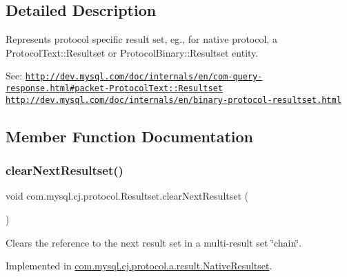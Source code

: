 \subsection{Detailed Description}
Represents protocol specific result set, eg., for native protocol, a Protocol\+Text\+::\+Resultset or Protocol\+Binary\+::\+Resultset entity.

See\+: \href{http://dev.mysql.com/doc/internals/en/com-query-response.html#packet-ProtocolText::Resultset}{\tt http\+://dev.\+mysql.\+com/doc/internals/en/com-\/query-\/response.\+html\#packet-\/\+Protocol\+Text\+::\+Resultset} \href{http://dev.mysql.com/doc/internals/en/binary-protocol-resultset.html}{\tt http\+://dev.\+mysql.\+com/doc/internals/en/binary-\/protocol-\/resultset.\+html} 

\subsection{Member Function Documentation}
\mbox{\label{interfacecom_1_1mysql_1_1cj_1_1protocol_1_1_resultset_ab66d8aa07fe7c7860c0852a7a10f4e27}} 
\subsubsection{\texorpdfstring{clear\+Next\+Resultset()}{clearNextResultset()}}
{\footnotesize\ttfamily void com.\+mysql.\+cj.\+protocol.\+Resultset.\+clear\+Next\+Resultset (\begin{DoxyParamCaption}{ }\end{DoxyParamCaption})}

Clears the reference to the next result set in a multi-\/result set \char`\"{}chain\char`\"{}. 

Implemented in \mbox{\hyperlink{classcom_1_1mysql_1_1cj_1_1protocol_1_1a_1_1result_1_1_native_resultset_a2a2679a79ede89432e8b54d6eff42138}{com.\+mysql.\+cj.\+protocol.\+a.\+result.\+Native\+Resultset}}.

\mbox{\label{interfacecom_1_1mysql_1_1cj_1_1protocol_1_1_resultset_aeb71f17cb0bbc2c33b47bc7e6a1f750c}} 
